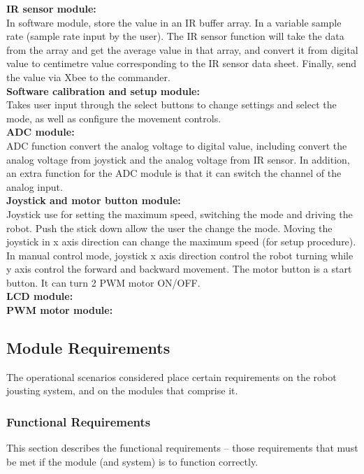\documentclass[MTRX3700report.tex]{subfiles}
\begin{document}
\textbf{IR sensor module:}\\
In software module, store the value in an IR buffer array. In a variable sample rate (sample rate input by the user). The IR sensor function will take the data from the array and get the average value in that array, and convert it from digital value to centimetre value corresponding to the IR sensor data sheet. Finally, send the value via Xbee to the commander.\\

\textbf{Software calibration and  setup module:}\\
Takes user input through the select buttons to change settings and select the mode, as well as configure the movement controls.\\



\textbf{ADC module:}\\
ADC function convert the analog voltage to digital value, including convert the analog voltage from joystick and the analog voltage from IR sensor. In addition, an extra function for the ADC module is that it can switch the channel of the analog input.\\
\textbf{Joystick and motor button module:}\\
Joystick use for setting the maximum speed, switching the mode and driving the robot. Push the stick down allow the user the change the mode. Moving the joystick in x axis direction can change the maximum speed (for setup procedure). In manual control mode, joystick x axis direction control the robot turning while y axis control the forward and backward movement. The motor button is a start button. It can turn 2 PWM motor ON/OFF.\\

\textbf{LCD module:}\\

\textbf{PWM motor module:}\\




\subsection{Module Requirements}
The operational scenarios considered place certain requirements on the robot jousting system, and on the modules that comprise it.

\subsubsection{Functional Requirements}
This section describes the functional requirements – those requirements that must be met if the module (and system) is to function correctly. 
\end{document}
